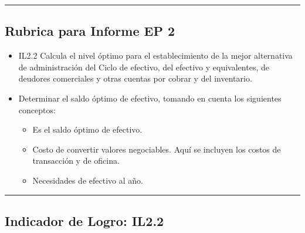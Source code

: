 \documentclass[
  letterpaper,
  DIV=11,
  numbers=noendperiod]{scrartcl}
\providecommand{\tightlist}{%
  \setlength{\itemsep}{0pt}\setlength{\parskip}{0pt}}\usepackage{longtable,booktabs,array}
\begin{document}
\begin{center}\rule{0.5\linewidth}{0.5pt}\end{center}

\subsection{Rubrica para Informe EP 2}\label{rubrica-para-informe-ep-2}

\begin{itemize}
\item
  IL2.2 Calcula el nivel óptimo para el establecimiento de la mejor
  alternativa de administración del Ciclo de efectivo, del efectivo y
  equivalentes, de deudores comerciales y otras cuentas por cobrar y del
  inventario.
\item
  Determinar el saldo óptimo de efectivo, tomando en cuenta los
  siguientes conceptos:

  \begin{itemize}
  \tightlist
  \item
    Es el saldo óptimo de efectivo.
  \item
    Costo de convertir valores negociables. Aquí se incluyen los costos
    de transacción y de oficina.
  \item
    Necesidades de efectivo al año.
  \end{itemize}
\end{itemize}

\begin{center}\rule{0.5\linewidth}{0.5pt}\end{center}

\subsection{Indicador de Logro: IL2.2}\label{indicador-de-logro-il2.2}
\end{document}

